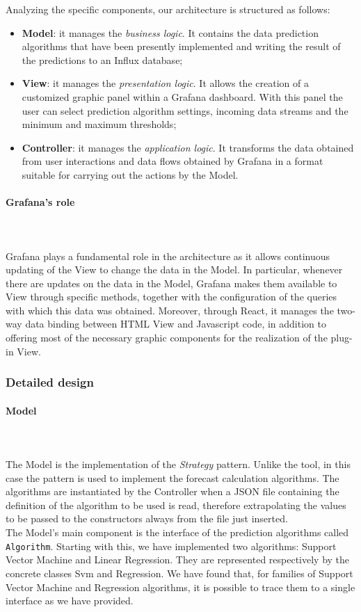 Analyzing the specific components, our architecture is structured as follows:
\begin{itemize}
\item \textbf{Model}: it manages the \textit{business logic}. It contains
the data prediction algorithms that have been presently implemented and writing the result of the predictions to an Influx database;
\item \textbf{View}: it manages the \textit{presentation logic}. It allows the creation of a customized graphic panel within a Grafana dashboard. With this panel the user can select prediction algorithm settings, incoming data streams and the minimum and maximum thresholds;
\item \textbf{Controller}: it manages the \textit{application logic}. It transforms the data obtained from user interactions and data flows obtained by Grafana in a format suitable for carrying out the actions by the Model.
\end{itemize}


\paragraph{Grafana's role}\mbox{} \\ \mbox{} \\
Grafana plays a fundamental role in the architecture as it allows continuous updating of the View to change the data in the Model. In particular, whenever there are updates on the data in the Model, Grafana makes them available to View through specific methods, together with the configuration of the queries with which this data was obtained. Moreover, through React, it manages the two-way data binding between HTML View and Javascript code, in addition to offering most of the necessary graphic components for the realization of the plug-in View.

\subsubsection{Detailed design}
\paragraph{Model}\mbox{} \\ \mbox{} \\
The Model is the implementation of the \textit{Strategy} pattern. Unlike the tool, in this case the pattern is used to implement the forecast calculation algorithms.
The algorithms are instantiated by the Controller when a JSON file containing the definition of the algorithm to be used is read, therefore extrapolating the values to be passed to the constructors always from the file just inserted.\\
The Model's main component is the interface of the prediction algorithms
called \texttt{Algorithm}. Starting with this, we have implemented
two algorithms: Support Vector Machine and Linear Regression.
They are represented respectively by the concrete classes Svm and Regression. We have found that, for families of Support Vector Machine and Regression algorithms, it is possible to trace them to a single interface as we have provided.

